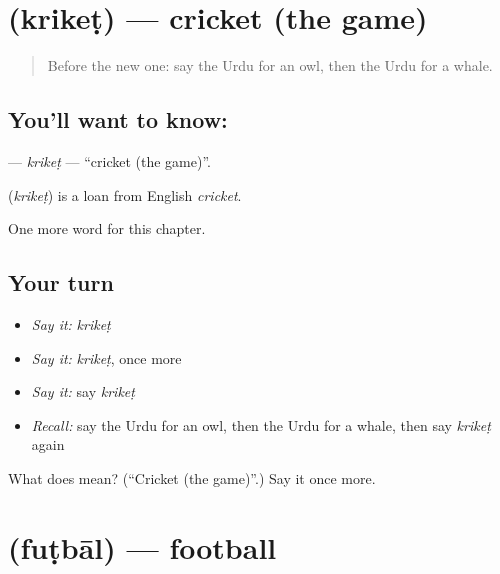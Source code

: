 \section[\texorpdfstring{\ur{کرکٹ} (krikeṭ)}{کرکٹ (krikeṭ)}]{ (krikeṭ) — cricket (the game)}

\label{lesson:UR-C168-kriket}



\begin{quote}
Before the new one: say the Urdu for an owl, then the Urdu for a whale.
\end{quote}

\subsection*{You'll want to know: }
\textbf{} — \emph{krikeṭ} — \textquotedblleft{}cricket (the game)\textquotedblright{}.

\begin{cousinweb}
\textbf{} (\emph{krikeṭ}) is a loan from English \emph{cricket}.
\end{cousinweb}

\begin{grammarlens}[title={What you've built}]
One more word for this chapter.
\end{grammarlens}

\subsection*{Your turn}
\begin{itemize}
\raggedright
  \item \emph{Say it:} \emph{krikeṭ}
  \item \emph{Say it:} \emph{krikeṭ}, once more
  \item \emph{Say it:} say \emph{krikeṭ}
  \item \emph{Recall:} say the Urdu for an owl, then the Urdu for a whale, then say \emph{krikeṭ} again
\end{itemize}

\begin{tcolorbox}[breakable,colback=teal!4,colframe=teal!35!black,title={Before you move on}]
What does  mean? (\textquotedblleft{}Cricket (the game)\textquotedblright{}.) Say it once more.
\end{tcolorbox}
\section[\texorpdfstring{\ur{فٹ} \ur{بال} (fuṭbāl)}{فٹ بال (fuṭbāl)}]{  (fuṭbāl) — football}

